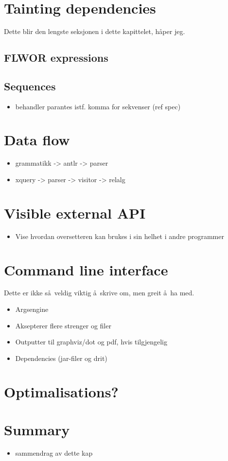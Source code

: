 \section{Tainting dependencies}
\label{sect:impl:tainting_deps}
Dette blir den lengste seksjonen i dette kapittelet, h\aa per jeg.
\subsection{FLWOR expressions}
\subsection{Sequences}
\begin{itemize}
  \item behandler parantes istf. komma for sekvenser (ref spec) 
\end{itemize}

\section{Data flow}
\begin{itemize}
  \item grammatikk -> antlr -> parser
  \item xquery -> parser -> visitor -> relalg
\end{itemize}

\section{Visible external API}
\begin{itemize}
  \item Vise hvordan oversetteren kan brukes i sin helhet i andre programmer
\end{itemize}

\section{Command line interface}
Dette er ikke s\aa~veldig viktig \aa~skrive om, men greit \aa~ha med.
\begin{itemize}
  \item Argsengine
  \item Aksepterer flere strenger og filer
  \item Outputter til graphviz/dot og pdf, hvis tilgjengelig
  \item Dependencies (jar-filer og drit)
\end{itemize}

\section{Optimalisations?}

\section{Summary}
\label{sect:impl:summary}
\begin{itemize}
  \item sammendrag av dette kap
\end{itemize}